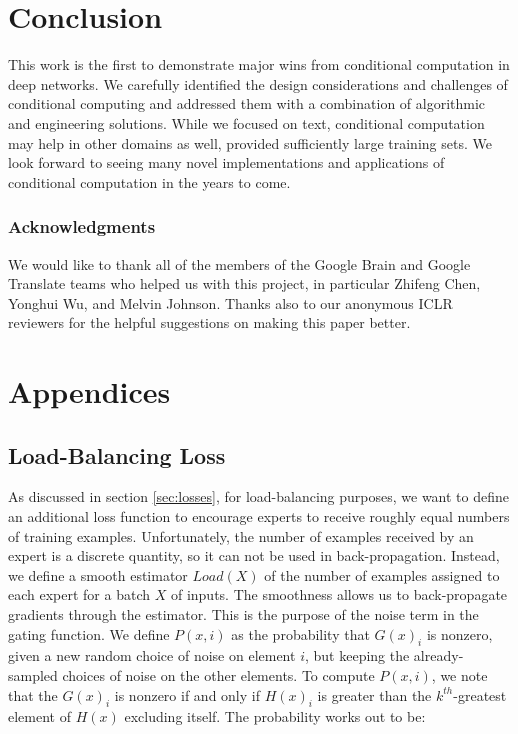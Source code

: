 \documentclass{article} %
\begin{document}
\vspace{-8pt}\section{Conclusion}\label{sec:conc}

This work is the first to demonstrate major wins from conditional computation in deep networks.  We carefully identified the design considerations and challenges of conditional computing and addressed them with a combination of algorithmic and engineering solutions. While we focused on text, conditional computation may help in other domains as well, provided sufficiently large training sets. We look forward to seeing many novel implementations and applications of conditional computation in the years to come.



\subsubsection*{Acknowledgments}
We would like to thank all of the members of the Google Brain and Google Translate teams who helped us with this project, in particular Zhifeng Chen, Yonghui Wu, and Melvin Johnson.  Thanks also to our anonymous ICLR reviewers for the helpful suggestions on making this paper better.





\newpage
\appendix
\section*{Appendices}
\renewcommand{\thesubsection}{\Alph{subsection}}

\subsection{Load-Balancing Loss} \label{sec:load}

As discussed in section \ref{sec:losses}, for load-balancing purposes, we want to define an additional loss function to encourage experts to receive roughly equal numbers of training examples.  Unfortunately, the number of examples received by an expert is a discrete quantity, so it can not be used in back-propagation.  Instead, we define a smooth estimator $Load(X)$ of the number of examples assigned to each expert for a batch $X$ of inputs.  The smoothness allows us to back-propagate gradients through the estimator.  This is the purpose of the noise term in the gating function.  We define $P(x, i)$ as the probability that $G(x)_i$ is nonzero, given a new random choice of noise on element $i$, but keeping the already-sampled choices of noise on the other elements.  To compute $P(x, i)$, we note that the $G(x)_i$ is nonzero if and only if $H(x)_i$ is greater than the $k^{th}$-greatest element of $H(x)$ excluding itself. The probability works out to be:
\end{document}

